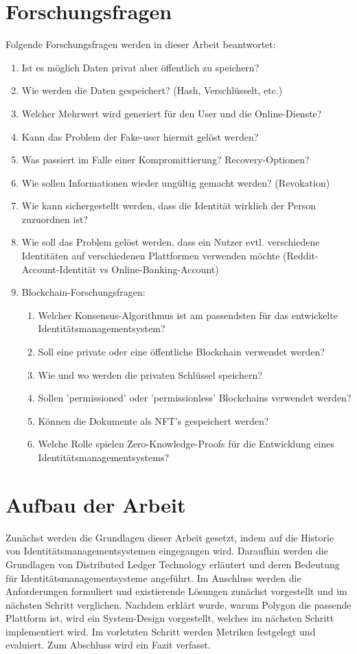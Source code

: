 \section{Forschungsfragen}
\label{forschungsfragen}
Folgende Forschungsfragen werden in dieser Arbeit beantwortet:
\begin{enumerate}
	\item Ist es möglich Daten privat aber öffentlich zu speichern?
	\item Wie werden die Daten gespeichert? (Hash, Verschlüsselt, etc.) 
	\item Welcher Mehrwert wird generiert für den User und die Online-Dienste?
	\item Kann das Problem der Fake-user hiermit gelöst werden?
	\item Was passiert im Falle einer Kompromittierung?  Recovery-Optionen?
	\item Wie sollen Informationen wieder ungültig gemacht werden? (Revokation)
	\item Wie kann sichergestellt werden, dass die Identität wirklich der Person zuzuordnen ist?
	\item Wie soll das Problem gelöst werden, dass ein Nutzer evtl. verschiedene Identitäten auf verschiedenen Plattformen verwenden möchte (Reddit-Account-Identität vs Online-Banking-Account)
	\item Blockchain-Forschungsfragen:
	\begin{enumerate}
		\item Welcher Konsensus-Algorithmus ist am passendsten für das entwickelte Identitätsmanagementsystem?
		\item Soll eine private oder eine öffentliche Blockchain verwendet werden?
		\item Wie und wo werden die privaten Schlüssel speichern?
		\item Sollen 'permissioned' oder 'permissionless' Blockchains verwendet werden?
		\item Können die Dokumente als NFT's gespeichert werden?
		\item Welche Rolle spielen Zero-Knowledge-Proofs für die Entwicklung eines Identitätsmanagementsystems?
	\end{enumerate}	
\end{enumerate}

\section{Aufbau der Arbeit}
Zunächst werden die Grundlagen dieser Arbeit gesetzt, indem auf die Historie von Identitätsmanagementsystemen eingegangen wird. Daraufhin werden die Grundlagen von Distributed Ledger Technology erläutert und deren Bedeutung für Identitätsmanagementsysteme angeführt. Im Anschluss werden die Anforderungen formuliert und existierende Lösungen zunächst vorgestellt und im nächsten Schritt verglichen. Nachdem erklärt wurde, warum Polygon die passende Plattform ist, wird ein System-Design vorgestellt, welches im nächsten Schritt implementiert wird. Im vorletzten Schritt werden Metriken festgelegt und evaluiert. Zum Abschluss wird ein Fazit verfasst.